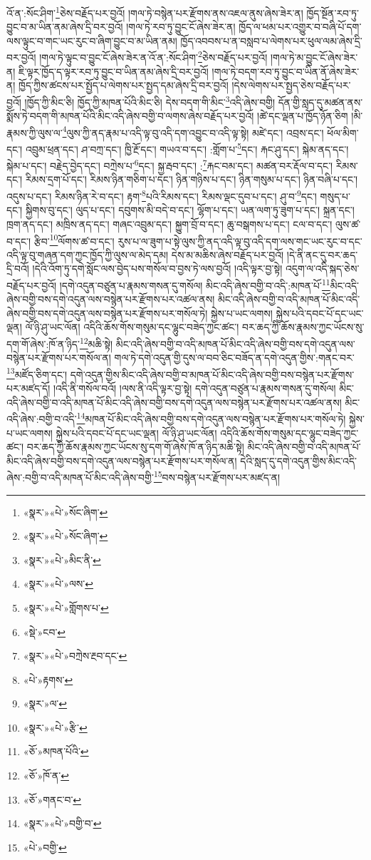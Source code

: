འོ་ན་:སོང་ཤིག་\footnote{«སྣར་»«པེ་»སོང་ཞིག་}ཅེས་བརྗོད་པར་བྱའོ། །གལ་ཏེ་བསྙེན་པར་རྫོགས་ནས་འཇལ་ནུས་ཞེས་ཟེར་ན། ཁྱོད་སྔོན་རབ་ཏུ་བྱུང་བ་མ་ཡིན་ནམ་ཞེས་དྲི་བར་བྱའོ། །གལ་ཏེ་རབ་ཏུ་བྱུང་ངོ་ཞེས་ཟེར་ན། ཁྱོད་ལ་ཕམ་པར་འགྱུར་བ་བཞི་པོ་དག་ལས་ལྟུང་བ་གང་ཡང་རུང་བ་ཞིག་བྱུང་བ་མ་ཡིན་ནམ། ཁྱོད་འབབས་པ་ན་བསླབ་པ་ལེགས་པར་ཕུལ་ལམ་ཞེས་དྲི་བར་བྱའོ། །གལ་ཏེ་ལྟུང་བ་བྱུང་ངོ་ཞེས་ཟེར་ན་འོ་ན་:སོང་ཤིག་\footnote{«སྣར་»«པེ་»སོང་ཞིག་}ཅེས་བརྗོད་པར་བྱའོ། །གལ་ཏེ་མ་བྱུང་ངོ་ཞེས་ཟེར་ན། ཇི་ལྟར་ཁྱོད་ད་ལྟར་རབ་ཏུ་བྱུང་བ་ཡིན་ནམ་ཞེས་དྲི་བར་བྱའོ། །གལ་ཏེ་བདག་རབ་ཏུ་བྱུང་བ་ཡིན་ནོ་ཞེས་ཟེར་ན། ཁྱོད་ཀྱིས་ཚངས་པར་སྤྱོད་པ་ལེགས་པར་སྤྱད་དམ་ཞེས་དྲི་བར་བྱའོ། །དེས་ལེགས་པར་སྤྱད་ཅེས་བརྗོད་པར་བྱའོ། །ཁྱོད་ཀྱི་མིང་ཅི། ཁྱོད་ཀྱི་མཁན་པོའི་མིང་ཅི། དེས་བདག་གི་མིང་\footnote{«སྣར་»«པེ་»མིང་ནི་}འདི་ཞེས་བགྱི། དོན་གྱི་སླད་དུ་མཚན་ནས་སྨོས་ཏེ་བདག་གི་མཁན་པོའི་མིང་འདི་ཞེས་བགྱི་བ་ལགས་ཞེས་བརྗོད་པར་བྱའོ། །ཚེ་དང་ལྡན་པ་ཁྱོད་ཉོན་ཅིག །མི་རྣམས་ཀྱི་ལུས་ལ་\footnote{«སྣར་»«པེ་»ལས་}ལུས་ཀྱི་ནད་རྣམ་པ་འདི་ལྟ་བུ་འདི་དག་འབྱུང་བ་འདི་ལྟ་སྟེ། མཛེ་དང་། འབྲས་དང་། ཕོལ་མིག་དང་། འབྲུམ་ཕྲན་དང་། ཤ་བཀྲ་དང་། ཁྱི་རྔོ་དང་། གཡའ་བ་དང་། :གློག་པ་\footnote{«སྣར་»«པེ་»གློགས་པ་}དང་། རྐང་ཤུ་དང་། སྐེམ་ནད་དང་། སྐེམ་པ་དང་། བརྗེད་བྱེད་དང་། བཀྲེས་པ་\footnote{«སྡེ་»ངབ་}དང་། སྐྱ་རྦབ་དང་། :\footnote{«སྣར་»«པེ་»བཀྲེས་རྔབ་དང་}རྐང་བམ་དང་། མཚན་བར་རྡོལ་བ་དང་། རིམས་དང་། རིམས་དྲག་པོ་དང་། རིམས་ཉིན་གཅིག་པ་དང་། ཉིན་གཉིས་པ་དང་། ཉིན་གསུམ་པ་དང་། ཉིན་བཞི་པ་དང་། འདུས་པ་དང་། རིམས་ཉིན་རེ་བ་དང་། རྟག་\footnote{«པེ་»རྟགས་}པའི་རིམས་དང་། རིམས་ལྡང་དུབ་པ་དང་། ཤུ་བ་\footnote{«སྣར་»ལ་}དང་། གསུད་པ་དང་། སྐྱིགས་བུ་དང་། ལུད་པ་དང་། དབུགས་མི་བདེ་བ་དང་། ལྷོག་པ་དང་། ཡན་ལག་ཏུ་ཟུག་པ་དང་། སྐྲན་དང་། ཁྲག་ནད་དང་། མཁྲིས་ནད་དང་། གཞང་འབྲུམ་དང་། སྐྱུག་བྲོ་བ་དང་། ཆུ་བསྒགས་པ་དང་། ངལ་བ་དང་། ལུས་ཚ་བ་དང་། རྩིབ་\footnote{«སྣར་»«པེ་»རྩི་}ལོགས་ཚ་བ་དང་། རུས་པ་ལ་ཟུག་པ་སྟེ་ལུས་ཀྱི་ནད་འདི་ལྟ་བུ་འདི་དག་ལས་གང་ཡང་རུང་བ་དང་འདི་ལྟ་བུ་གཞན་དག་ཀྱང་ཁྱོད་ཀྱི་ལུས་ལ་མེད་དམ། དེས་མ་མཆིས་ཞེས་བརྗོད་པར་བྱའོ། །དེ་ནི་ནང་དུ་བར་ཆད་དྲི་བའོ། །དེའི་འོག་ཏུ་དགེ་སློང་ལས་བྱེད་པས་གསོལ་བ་བྱས་ཏེ་ལས་བྱའོ། །འདི་ལྟར་བྱ་སྟེ། འདུག་ལ་འདི་སྐད་ཅེས་བརྗོད་པར་བྱའོ། །དགེ་འདུན་བཙུན་པ་རྣམས་གསན་དུ་གསོལ། མིང་འདི་ཞེས་བགྱི་བ་འདི་:མཁན་པོ་\footnote{«ཅོ་»མཁན་པོའི་}མིང་འདི་ཞེས་བགྱི་བས་དགེ་འདུན་ལས་བསྙེན་པར་རྫོགས་པར་འཚལ་ནས། མིང་འདི་ཞེས་བགྱི་བ་འདི་མཁན་པོ་མིང་འདི་ཞེས་བགྱི་བས་དགེ་འདུན་ལས་བསྙེན་པར་རྫོགས་པར་གསོལ་ཏེ། སྐྱེས་པ་ཡང་ལགས། སྐྱེས་པའི་དབང་པོ་དང་ཡང་ལྡན། ལོ་ཉི་ཤུ་ཡང་ལོན། འདིའི་ཆོས་གོས་གསུམ་དང་ལྷུང་བཟེད་ཀྱང་ཚང་། བར་ཆད་ཀྱི་ཆོས་རྣམས་ཀྱང་ཡོངས་སུ་དག་གོ་ཞེས་:ཁོ་ན་ཉིད་\footnote{«ཅོ་»ཁོ་ན་}མཆི་སྟེ། མིང་འདི་ཞེས་བགྱི་བ་འདི་མཁན་པོ་མིང་འདི་ཞེས་བགྱི་བས་དགེ་འདུན་ལས་བསྙེན་པར་རྫོགས་པར་གསོལ་ན། གལ་ཏེ་དགེ་འདུན་གྱི་དུས་ལ་བབ་ཅིང་བཟོད་ན་དགེ་འདུན་གྱིས་:གནང་བར་\footnote{«ཅོ་»གནང་བ་}མཛོད་ཅིག་དང་། དགེ་འདུན་གྱིས་མིང་འདི་ཞེས་བགྱི་བ་མཁན་པོ་མིང་འདི་ཞེས་བགྱི་བས་བསྙེན་པར་རྫོགས་པར་མཛད་དོ། །འདི་ནི་གསོལ་བའོ། །ལས་ནི་འདི་ལྟར་བྱ་སྟེ། དགེ་འདུན་བཙུན་པ་རྣམས་གསན་དུ་གསོལ། མིང་འདི་ཞེས་བགྱི་བ་འདི་མཁན་པོ་མིང་འདི་ཞེས་བགྱི་བས་དགེ་འདུན་ལས་བསྙེན་པར་རྫོགས་པར་འཚལ་ནས། མིང་འདི་ཞེས་:བགྱི་བ་འདི་\footnote{«སྣར་»«པེ་»བགྱི་བ་}མཁན་པོ་མིང་འདི་ཞེས་བགྱི་བས་དགེ་འདུན་ལས་བསྙེན་པར་རྫོགས་པར་གསོལ་ཏེ། སྐྱེས་པ་ཡང་ལགས། སྐྱེས་པའི་དབང་པོ་དང་ཡང་ལྡན། ལོ་ཉི་ཤུ་ཡང་ལོན། འདིའི་ཆོས་གོས་གསུམ་དང་ལྷུང་བཟེད་ཀྱང་ཚང་། བར་ཆད་ཀྱི་ཆོས་རྣམས་ཀྱང་ཡོངས་སུ་དག་གོ་ཞེས་ཁོ་ན་ཉིད་མཆི་སྟེ། མིང་འདི་ཞེས་བགྱི་བ་འདི་མཁན་པོ་མིང་འདི་ཞེས་བགྱི་བས་དགེ་འདུན་ལས་བསྙེན་པར་རྫོགས་པར་གསོལ་ན། དེའི་སླད་དུ་དགེ་འདུན་གྱིས་མིང་འདི་ཞེས་:བགྱི་བ་འདི་མཁན་པོ་མིང་འདི་ཞེས་བགྱི་\footnote{«པེ་»བགྱི་}བས་བསྙེན་པར་རྫོགས་པར་མཛད་ན། 